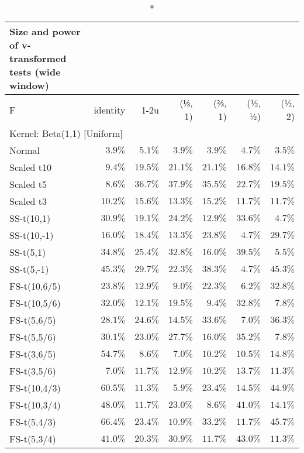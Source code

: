 \setlength{\LTpost}{0mm}
\begin{longtable}{lrrrrrr}
\caption*{
{\large Size and power of v-transformed tests (wide window)}
} \\ 
\toprule
F & identity & \textbar{}1-2u\textbar{} & (⅓, 1) & (⅔, 1) & (½, ½) & (½, 2) \\ 
\midrule
\multicolumn{7}{l}{Kernel: Beta(1,1) [Uniform]} \\ 
\midrule
Normal & $3.9\%$ & $5.1\%$ & $3.9\%$ & $3.9\%$ & $4.7\%$ & $3.5\%$ \\ 
Scaled t10 & $9.4\%$ & $19.5\%$ & $21.1\%$ & $21.1\%$ & $16.8\%$ & $14.1\%$ \\ 
Scaled t5 & $8.6\%$ & $36.7\%$ & $37.9\%$ & $35.5\%$ & $22.7\%$ & $19.5\%$ \\ 
Scaled t3 & $10.2\%$ & $15.6\%$ & $13.3\%$ & $15.2\%$ & $11.7\%$ & $11.7\%$ \\ 
SS-t(10,1) & $30.9\%$ & $19.1\%$ & $24.2\%$ & $12.9\%$ & $33.6\%$ & $4.7\%$ \\ 
SS-t(10,-1) & $16.0\%$ & $18.4\%$ & $13.3\%$ & $23.8\%$ & $4.7\%$ & $29.7\%$ \\ 
SS-t(5,1) & $34.8\%$ & $25.4\%$ & $32.8\%$ & $16.0\%$ & $39.5\%$ & $5.5\%$ \\ 
SS-t(5,-1) & $45.3\%$ & $29.7\%$ & $22.3\%$ & $38.3\%$ & $4.7\%$ & $45.3\%$ \\ 
FS-t(10,6/5) & $23.8\%$ & $12.9\%$ & $9.0\%$ & $22.3\%$ & $6.2\%$ & $32.8\%$ \\ 
FS-t(10,5/6) & $32.0\%$ & $12.1\%$ & $19.5\%$ & $9.4\%$ & $32.8\%$ & $7.8\%$ \\ 
FS-t(5,6/5) & $28.1\%$ & $24.6\%$ & $14.5\%$ & $33.6\%$ & $7.0\%$ & $36.3\%$ \\ 
FS-t(5,5/6) & $30.1\%$ & $23.0\%$ & $27.7\%$ & $16.0\%$ & $35.2\%$ & $7.8\%$ \\ 
FS-t(3,6/5) & $54.7\%$ & $8.6\%$ & $7.0\%$ & $10.2\%$ & $10.5\%$ & $14.8\%$ \\ 
FS-t(3,5/6) & $7.0\%$ & $11.7\%$ & $12.9\%$ & $10.2\%$ & $13.7\%$ & $11.3\%$ \\ 
FS-t(10,4/3) & $60.5\%$ & $11.3\%$ & $5.9\%$ & $23.4\%$ & $14.5\%$ & $44.9\%$ \\ 
FS-t(10,3/4) & $48.0\%$ & $11.7\%$ & $23.0\%$ & $8.6\%$ & $41.0\%$ & $14.1\%$ \\ 
FS-t(5,4/3) & $66.4\%$ & $23.4\%$ & $10.9\%$ & $33.2\%$ & $11.7\%$ & $45.7\%$ \\ 
FS-t(5,3/4) & $41.0\%$ & $20.3\%$ & $30.9\%$ & $11.7\%$ & $43.0\%$ & $11.3\%$ \\ 

\end{longtable}
